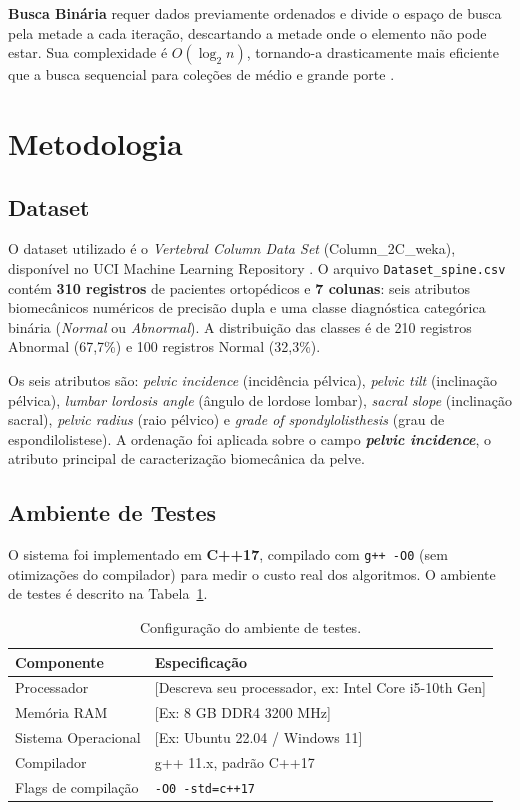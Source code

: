 \documentclass[12pt]{article}
\begin{document}
\textbf{Busca Binária} requer dados previamente ordenados e divide o espaço de busca pela metade a cada iteração, descartando a metade onde o elemento não pode estar. Sua complexidade é $O(\log_2 n)$, tornando-a drasticamente mais eficiente que a busca sequencial para coleções de médio e grande porte \cite{cormen2002}.

\section{Metodologia}
\label{sec:metodologia}

\subsection{Dataset}

O dataset utilizado é o \textit{Vertebral Column Data Set} (Column\_2C\_weka), disponível no UCI Machine Learning Repository \cite{uci_spine}. O arquivo \texttt{Dataset\_spine.csv} contém \textbf{310 registros} de pacientes ortopédicos e \textbf{7 colunas}: seis atributos biomecânicos numéricos de precisão dupla e uma classe diagnóstica categórica binária (\textit{Normal} ou \textit{Abnormal}). A distribuição das classes é de 210 registros Abnormal (67,7\%) e 100 registros Normal (32,3\%).

Os seis atributos são: \textit{pelvic incidence} (incidência pélvica), \textit{pelvic tilt} (inclinação pélvica), \textit{lumbar lordosis angle} (ângulo de lordose lombar), \textit{sacral slope} (inclinação sacral), \textit{pelvic radius} (raio pélvico) e \textit{grade of spondylolisthesis} (grau de espondilolistese). A ordenação foi aplicada sobre o campo \textbf{\textit{pelvic incidence}}, o atributo principal de caracterização biomecânica da pelve.

\subsection{Ambiente de Testes}

O sistema foi implementado em \textbf{C++17}, compilado com \texttt{g++ -O0} (sem otimizações do compilador) para medir o custo real dos algoritmos. O ambiente de testes é descrito na Tabela~\ref{tab:ambiente}.

\begin{table}[H]
\centering
\caption{Configuração do ambiente de testes.}
\label{tab:ambiente}
\begin{tabular}{ll}
\toprule
\textbf{Componente} & \textbf{Especificação} \\
\midrule
Processador & [Descreva seu processador, ex: Intel Core i5-10th Gen] \\
Memória RAM & [Ex: 8 GB DDR4 3200 MHz] \\
Sistema Operacional & [Ex: Ubuntu 22.04 / Windows 11] \\
Compilador & g++ 11.x, padrão C++17 \\
Flags de compilação & \texttt{-O0 -std=c++17} \\
\bottomrule
\end{tabular}
\end{table}
\end{document}
